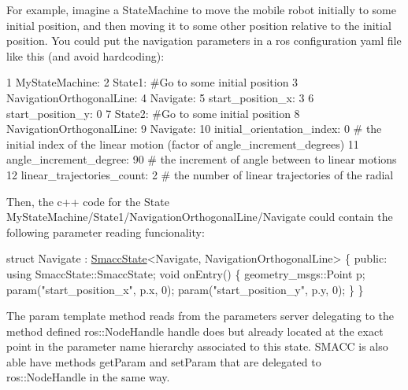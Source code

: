 For example, imagine a State\+Machine to move the mobile robot initially to some initial position, and then moving it to some other position relative to the initial position. You could put the navigation parameters in a ros configuration yaml file like this (and avoid hardcoding)\+:


\begin{DoxyCode}
1 MyStateMachine:
2     State1: #Go to some initial position
3         NavigationOrthogonalLine:
4             Navigate:
5                 start\_position\_x: 3
6                 start\_position\_y: 0
7     State2: #Go to some initial position
8         NavigationOrthogonalLine:
9             Navigate:
10                 initial\_orientation\_index: 0 # the initial index of the linear motion (factor of
       angle\_increment\_degrees)
11                 angle\_increment\_degree: 90    # the increment of angle between to linear motions
12                 linear\_trajectories\_count: 2  # the number of linear trajectories of the radial 
\end{DoxyCode}


Then, the c++ code for the State My\+State\+Machine/\+State1/\+Navigation\+Orthogonal\+Line/\+Navigate could contain the following parameter reading funcionality\+:


\begin{DoxyCode}
\textcolor{keyword}{struct }Navigate : \hyperlink{classSmaccState}{SmaccState}<Navigate, NavigationOrthogonalLine> 
\{
\textcolor{keyword}{public}:
  \textcolor{keyword}{using} SmaccState::SmaccState;
  \textcolor{keywordtype}{void} onEntry()
  \{
      geometry\_msgs::Point p;
      param(\textcolor{stringliteral}{"start\_position\_x"}, p.x, 0);
      param(\textcolor{stringliteral}{"start\_position\_y"}, p.y, 0);
  \}
\}
\end{DoxyCode}


The param template method reads from the parameters server delegating to the method defined ros\+::\+Node\+Handle handle does but already located at the exact point in the parameter name hierarchy associated to this state. S\+M\+A\+CC is also able have methods get\+Param and set\+Param that are delegated to ros\+::\+Node\+Handle in the same way. 